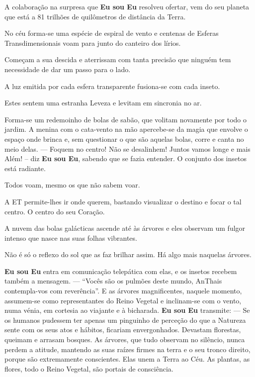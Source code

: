 A colaboração na surpresa que \textbf{Eu sou Eu} resolveu ofertar, vem do seu planeta que está a 81 trilhões de quilômetros de distância da Terra.

No céu forma-se uma espécie de espiral de vento e centenas de Esferas Transdimensionais voam para junto do canteiro dos lírios.

Começam a sua descida e aterrissam com tanta precisão que ninguém tem necessidade de dar um passo para o lado.

A luz emitida por cada esfera transparente fusiona-se com cada inseto.

Estes sentem uma estranha Leveza e levitam em sincronia no ar.

Forma-se um redemoinho de bolas de sabão, que volitam novamente por todo o jardim.
\bigbreak
A menina com o cata-vento na mão apercebe-se da magia que envolve o espaço onde brinca e, sem questionar o que são aquelas bolas, corre e canta no meio delas.
\bigbreak
— Foquem no centro! Não se desalinhem! Juntos vamos longe e mais Além! – diz \textbf{Eu sou Eu}, sabendo que se fazia entender.
\bigbreak
O conjunto dos insetos está radiante.

Todos voam, mesmo os que não sabem voar.

A ET permite-lhes ir onde querem, bastando visualizar o destino e focar o tal centro.
O centro do seu Coração.

A nuvem das bolas galácticas ascende até às árvores e eles observam um fulgor intenso que nasce nas suas folhas vibrantes.

Não é só o reflexo do sol que as faz brilhar assim. Há algo mais naquelas árvores.

 \textbf{Eu sou Eu} entra em comunicação telepática com elas, e os insetos recebem também a mensagem.
 \bigbreak
— “Vocês são os pulmões deste mundo, AnThais contempla-vos com reverência”.
\bigbreak
E as árvores magnificentes, naquele momento, assumem-se como representantes do Reino Vegetal e inclinam-se com o vento, numa vénia, em cortesia ao viajante e à bicharada.
\bigbreak
\textbf{Eu sou Eu} transmite:
\bigbreak
— Se os humanos pudessem ter apenas um pinguinho de perceção do que a Natureza sente com os seus atos e hábitos, ficariam envergonhados. Devastam florestas, queimam e arrasam bosques. As árvores, que tudo observam no silêncio, nunca perdem a atitude, mantendo as suas raízes firmes na terra e o seu tronco direito, porque são extremamente conscientes. Elas unem a Terra ao Céu.
\bigbreak
As plantas, as flores, todo o Reino Vegetal, são portais de consciência.

